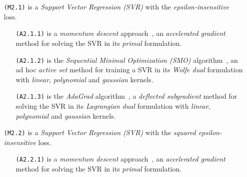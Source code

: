 \begin{itemize}
\item[\texttt{(M2.1)}] is a \emph{Support Vector Regression (SVR)} with the \emph{epsilon-insensitive} loss.

\begin{itemize}
\item[\texttt{(A2.1.1)}] is a \emph{momentum descent} approach~\cite{polyak1964some, nesterov1998introductory, nesterov1983method}, an \emph{accelerated gradient} method for solving the SVR in its \emph{primal} formulation.

\item[\texttt{(A2.1.2)}] is the \emph{Sequential Minimal Optimization (SMO)} algorithm~\cite{flake2002efficient, shevade1999improvements}, an ad hoc \emph{active set} method for training a SVR in its \emph{Wolfe dual} formulation with \emph{linear}, \emph{polynomial} and \emph{gaussian} kernels.

\item[\texttt{(A2.1.3)}] is the \emph{AdaGrad} algorithm~\cite{duchi2011adaptive}, a \emph{deflected subgradient} method for solving the SVR in its \emph{Lagrangian dual} formulation with \emph{linear}, \emph{polynomial} and \emph{gaussian} kernels.
\end{itemize}

\end{itemize}

\begin{itemize}
\item[\texttt{(M2.2)}] is a \emph{Support Vector Regression (SVR)} with the \emph{squared epsilon-insensitive} loss.

\begin{itemize}
\item[\texttt{(A2.2.1)}] is a \emph{momentum descent} approach~\cite{polyak1964some, nesterov1998introductory, nesterov1983method}, an \emph{accelerated gradient} method for solving the SVR in its \emph{primal} formulation.
\end{itemize}

\end{itemize}